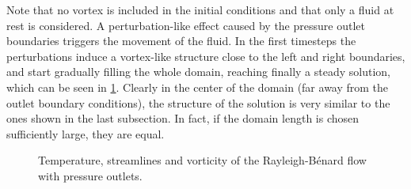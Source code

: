 Note that no vortex is included in the initial conditions and that only a fluid at rest is considered. A perturbation-like effect caused by the pressure outlet boundaries triggers the movement of the fluid. In the first timesteps the perturbations induce a vortex-like structure close to the left and right boundaries, and start gradually filling the whole domain, reaching finally a steady solution, which can be seen in \cref{fig:RayBerUnsteadySol}. Clearly in the center of the domain (far away from the outlet boundary conditions), the structure of the solution is very similar to the ones shown in the last subsection. In fact, if the domain length is chosen sufficiently large, they are equal. 
\begin{figure}[t]
	\centering
	\pgfplotsset{width=0.96\textwidth, compat=1.3}
	\par\bigskip%
	\par\bigskip%
	\caption{Temperature, streamlines and vorticity of the Rayleigh-Bénard flow with pressure outlets.}\label{fig:RayBerUnsteadySol}
\end{figure}
\FloatBarrier